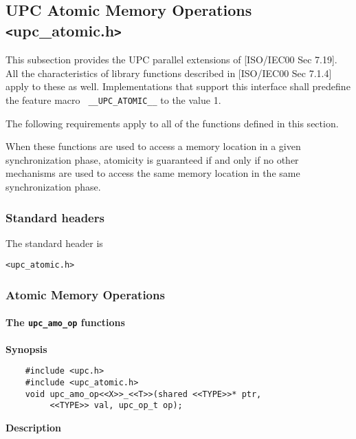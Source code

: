 \subsection{UPC Atomic Memory Operations \texttt{<}upc\_atomic.h\texttt{>}}

\npf This subsection provides the UPC parallel extensions of [ISO/IEC00 
    Sec 7.19].  All the characteristics of library functions described
    in [ISO/IEC00 Sec 7.1.4] apply to these as well.  Implementations
    that support this interface shall predefine the feature macro {\tt
    \_\_UPC\_ATOMIC\_\_} to the value 1.

\np The following requirements apply to all of the functions defined
    in this section.

\np When these functions are used to access a memory location in a given
    synchronization phase, atomicity is guaranteed if and only if no other
    mechanisms are used to access the same memory location in the same
    synchronization phase.

\subsubsection{Standard headers}

\np The standard header is

{\tt <upc\_atomic.h>}

\subsubsection{Atomic Memory Operations}

\paragraph{The {\tt upc\_amo\_op} functions}

{\bf Synopsis} 

\npf\vspace{-2.5em}
\begin{verbatim}
    #include <upc.h>
    #include <upc_atomic.h>
    void upc_amo_op<<X>>_<<T>>(shared <<TYPE>>* ptr,
         <<TYPE>> val, upc_op_t op);
\end{verbatim}

{\bf Description}

